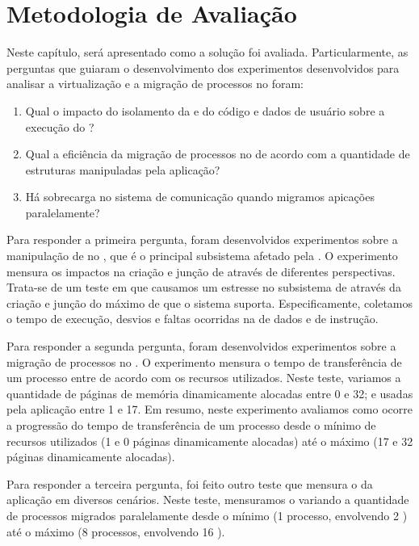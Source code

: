 \glsresetall
\chapter{Metodologia de Avaliação}
Neste capítulo, será apresentado como a solução foi avaliada. Particularmente, as perguntas que guiaram o desenvolvimento dos experimentos desenvolvidos para analisar a virtualização e a migração de processos no \nanvix foram:

\begin{enumerate}[label=(\roman*)]
    \item Qual o impacto do isolamento da \uarea e do código e dados de usuário sobre a execução do \nanvix?
    \item Qual a eficiência da migração de processos no \nanvix de acordo com a quantidade de estruturas manipuladas pela aplicação?
    \item Há sobrecarga no sistema de comunicação quando migramos apicações paralelamente?
\end{enumerate}

Para responder a primeira pergunta, foram desenvolvidos experimentos sobre a manipulação de \threads no \nanvix, que é o principal subsistema afetado pela \uarea. O experimento mensura os impactos na criação e junção de \threads através de diferentes perspectivas. Trata-se de um teste em que causamos um estresse no subsistema de \threads através da criação e junção do máximo de \threads que o sistema suporta. Especificamente, coletamos o tempo de execução, desvios e faltas ocorridas na \cache de dados e de instrução.

Para responder a segunda pergunta, foram desenvolvidos experimentos sobre a migração de processos no \nanvix. O experimento mensura o tempo de transferência de um processo entre \clusters de acordo com os recursos utilizados. Neste teste, variamos a quantidade de páginas de memória dinamicamente alocadas entre 0 e 32; e \threads usadas pela aplicação entre 1 e 17. Em resumo, neste experimento avaliamos como ocorre a progressão do tempo de transferência de um processo desde o mínimo de recursos utilizados (1 \thread e 0 páginas dinamicamente alocadas) até o máximo (17 \threads e 32 páginas dinamicamente alocadas).

Para responder a terceira pergunta, foi feito outro teste que mensura o \downtime da aplicação em diversos cenários. Neste teste, mensuramos o \downtime variando a quantidade de processos migrados paralelamente desde o mínimo (1 processo, envolvendo 2 \clusters) até o máximo (8 processos, envolvendo 16 \clusters).

